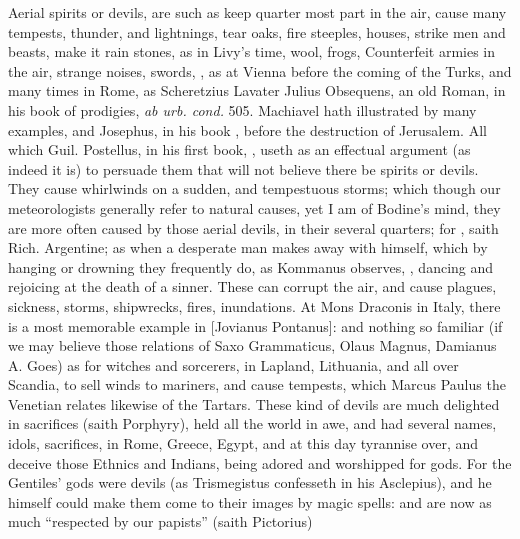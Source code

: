 Aerial spirits or devils, are such as keep quarter most part in the
air, cause many tempests, thunder, and lightnings, tear
oaks, fire steeples, houses, strike men and beasts, make it rain stones, as in
Livy's time, wool, frogs, \etc{} Counterfeit armies in the air, strange noises,
swords, \etc{}, as at Vienna before the coming of the Turks, and many times in
Rome, as Scheretzius  Lavater
 Julius Obsequens, an old
Roman, in his book of prodigies, \emph{ab urb. cond.} 505.
Machiavel hath illustrated by many examples, and Josephus,
in his book , before the destruction of
Jerusalem. All which Guil. Postellus, in his first book,
, useth as an effectual argument
(as indeed it is) to persuade them that will not believe there be spirits or
devils. They cause whirlwinds on a sudden, and tempestuous storms; which though
our meteorologists generally refer to natural causes, yet I am of Bodine's
mind,  they are more often caused by
those aerial devils, in their several quarters; for , saith Rich. Argentine; as when a desperate man
makes away with himself, which by hanging or drowning they frequently do, as
Kommanus observes, 
, dancing and rejoicing at the death of a sinner. These
can corrupt the air, and cause plagues, sickness, storms, shipwrecks, fires,
inundations. At Mons Draconis in Italy, there is a most memorable example in
[Jovianus Pontanus]: and nothing so familiar (if we may
believe those relations of Saxo Grammaticus, Olaus Magnus, Damianus A. Goes) as
for witches and sorcerers, in Lapland, Lithuania, and all over Scandia, to sell
winds to mariners, and cause tempests, which Marcus Paulus the Venetian relates
likewise of the Tartars. These kind of devils are much
delighted in sacrifices (saith Porphyry), held all the
world in awe, and had several names, idols, sacrifices, in Rome, Greece, Egypt,
and at this day tyrannise over, and deceive those Ethnics and Indians, being
adored and worshipped for gods. For the Gentiles' gods
were devils (as Trismegistus confesseth in his Asclepius),
and he himself could make them come to their images by magic spells: and are
now as much \enquote{respected by our papists} (saith Pictorius)
